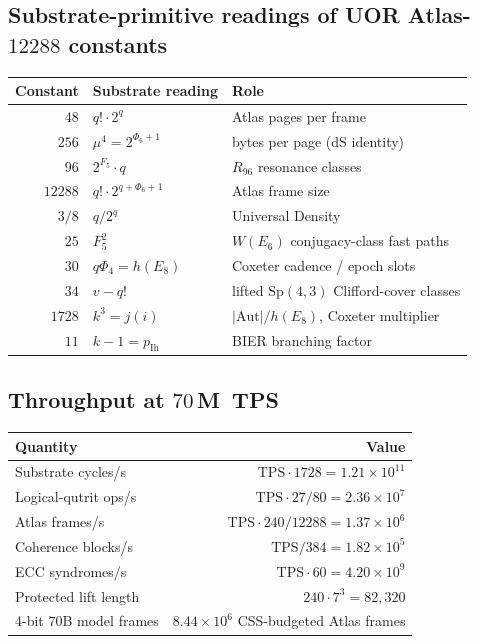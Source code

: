 \documentclass[11pt,letterpaper]{article}
\theoremstyle{remark}
\newcommand{\Sp}{\mathrm{Sp}}
\newcommand{\Aut}{\mathrm{Aut}}
\newcommand{\TPS}{\mathrm{TPS}}
\begin{document}
\subsection{\texorpdfstring{Substrate-primitive readings of UOR Atlas-$12288$ constants}{Substrate-primitive readings of UOR Atlas-12288 constants}}
\begin{center}
\renewcommand{\arraystretch}{1.15}
\begin{tabular}{rll}
\toprule
\textbf{Constant} & \textbf{Substrate reading} & \textbf{Role} \\
\midrule
$48$    & $q! \cdot 2^q$                   & Atlas pages per frame \\
$256$   & $\mu^4 = 2^{\Phi_6 + 1}$         & bytes per page (dS identity) \\
$96$    & $2^{F_5} \cdot q$                & $R_{96}$ resonance classes \\
$12288$ & $q! \cdot 2^{q + \Phi_6 + 1}$    & Atlas frame size \\
$3/8$   & $q / 2^q$                        & Universal Density \\
$25$    & $F_5^2$                           & $W(E_6)$ conjugacy-class fast paths \\
$30$    & $q\Phi_4 = h(E_8)$               & Coxeter cadence / epoch slots \\
$34$    & $v-q!$                            & lifted $\Sp(4,3)$ Clifford-cover classes \\
$1728$  & $k^3 = j(i)$                     & $|\Aut|/h(E_8)$, Coxeter multiplier \\
$11$    & $k - 1 = p_{\mathrm{Ih}}$        & BIER branching factor \\
\bottomrule
\end{tabular}
\end{center}

\subsection{\texorpdfstring{Throughput at $70$\,M~TPS}{Throughput at 70M TPS}}
\begin{center}
\renewcommand{\arraystretch}{1.18}
\begin{tabular}{lr}
\toprule
\textbf{Quantity} & \textbf{Value} \\
\midrule
Substrate cycles/s   & $\TPS \cdot 1728  = 1.21\times 10^{11}$ \\
Logical-qutrit ops/s & $\TPS \cdot 27/80 = 2.36\times 10^7$ \\
Atlas frames/s       & $\TPS \cdot 240/12288 = 1.37\times 10^6$ \\
Coherence blocks/s   & $\TPS / 384      = 1.82\times 10^5$ \\
ECC syndromes/s      & $\TPS \cdot 60   = 4.20\times 10^9$ \\
Protected lift length & $240\cdot 7^3 = 82{,}320$ \\
4-bit $70$B model frames & $8.44\times 10^6$ CSS-budgeted Atlas frames \\
\bottomrule
\end{tabular}
\end{center}
\end{document}
